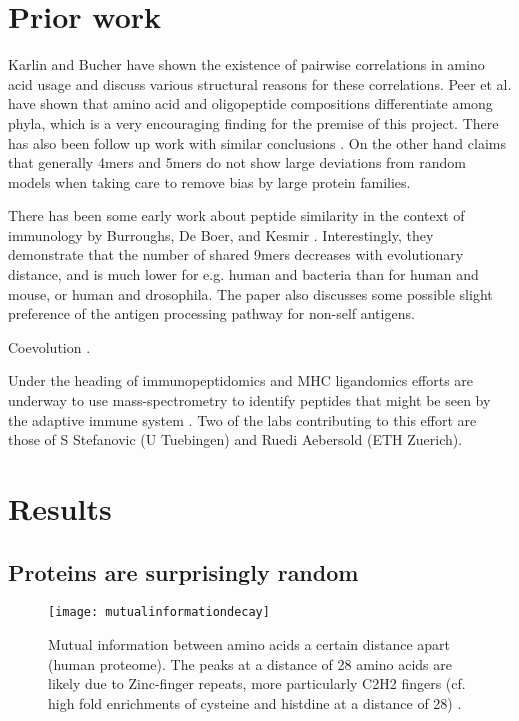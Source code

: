 \documentclass[superscriptaddress,onecolumn,pre]{revtex4}
\newcommand{\<}{\langle}
\renewcommand{\>}{\rangle}
\begin{document}
\section{Prior work}

Karlin and Bucher \cite{Karlin1992} have shown the existence of pairwise correlations in amino acid usage and discuss various structural reasons for these correlations. Peer et al. \cite{Peer2004} have shown that amino acid and oligopeptide compositions differentiate among phyla, which is a very encouraging finding for the premise of this project. There has also been follow up work with similar conclusions \cite{Bogatyreva2006}. On the other hand \cite{Lavelle2009} claims that generally 4mers and 5mers do not show large deviations from random models when taking care to remove bias by large protein families.

There has been some early work about peptide similarity in the context of immunology by Burroughs, De Boer, and Kesmir \cite{Burroughs2004}. Interestingly, they demonstrate that the number of shared 9mers decreases with evolutionary distance, and is much lower for e.g. human and bacteria than for human and mouse, or human and drosophila. The paper also discusses some possible slight preference of the antigen processing pathway for non-self antigens.

Coevolution \cite{Bahir2009}.

Under the heading of immunopeptidomics and MHC ligandomics efforts are underway to use mass-spectrometry to identify peptides that might be seen by the adaptive immune system \cite{Abelin2017,Liepe2016}. Two of the labs contributing to this effort are those of S Stefanovic (U Tuebingen) and Ruedi Aebersold (ETH Zuerich).

\section{Results}

\subsection{Proteins are surprisingly random}

\begin{figure}
    \texttt{[image: mutualinformationdecay]}
    \caption{Mutual information between amino acids a certain distance apart (human proteome). The peaks at a distance of 28 amino acids are likely due to Zinc-finger repeats, more particularly C2H2 fingers (cf. high fold enrichments of cysteine and histdine at a distance of 28) \cite{Krishna2003}. 
    \label{figmutualinformationdecay}
    }
\end{figure}
\end{document}
